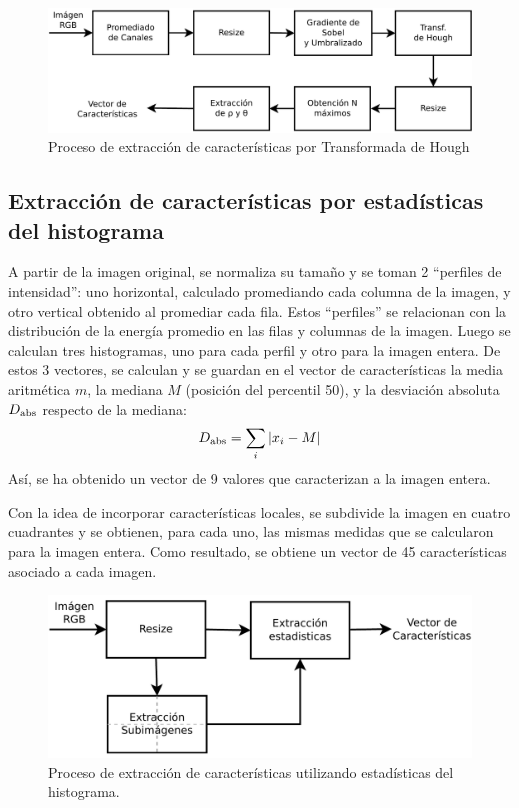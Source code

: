 \documentclass[conference,a4paper,10pt,oneside,final]{tfmpd}
\begin{document}
\begin{figure}
\begin{center}
\includegraphics[scale=0.25]{../diagramas/procesohough} 
\end{center}
\caption{Proceso de extracción de características por Transformada de Hough}
\label{procesohough}
\end{figure}
%
%
\subsection{Extracción de características por estadísticas del histograma}
A partir de la imagen original, se normaliza su tamaño y se toman 2
``perfiles de intensidad'': uno horizontal, calculado promediando
cada columna de la imagen, y otro vertical obtenido al promediar cada fila.
Estos ``perfiles'' se relacionan con la distribución de la energía promedio
en las filas y columnas de la imagen.
Luego se calculan tres histogramas, uno para cada perfil y otro para la
imagen entera. De estos 3 vectores, se calculan y se guardan en el
vector de características la media aritmética $m$, la mediana $M$ (posición del
percentil 50),  y la desviación absoluta $D_{\textrm{abs}}$ respecto de la mediana:
\begin{equation*}
D_{\textrm{abs}}=\sum_i |x_i - M|
\end{equation*}
Así, se ha obtenido un vector de 9 valores que caracterizan %
a la imagen entera.

Con la idea de incorporar características locales,
se sub\-di\-vi\-de la imagen en cuatro
cuadrantes y se obtienen, para cada uno, las mismas medidas que se calcularon
para  la imagen entera. Como resultado, se obtiene un vector de 45
características asociado a cada imagen.

\begin{figure}
\begin{center}
\includegraphics[scale=0.25]{../diagramas/procesoestadisticas}
\end{center}
\caption{Proceso de extracción de características utilizando estadísticas del
histograma.}
\label{procesoestadisticas}
\end{figure}
\end{document}
